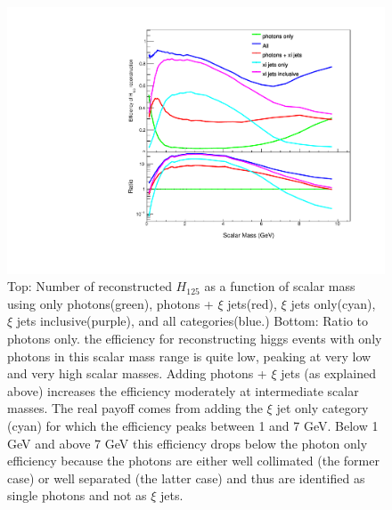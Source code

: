 \documentclass[aps,onecolumn,twoside,secnumarabic,balancelastpage,amsmath,amssymb,nofootinbib,hyperref=pdftex]{revtex4}
\begin{document}
\begin{figure}[t]
\begin{center}
\includegraphics[width=12cm]{higgs_reco_eff.pdf}

\caption{Top: Number of reconstructed $H_{125}$ as a function of scalar mass using only photons(green), photons + $\xi$ jets(red), $\xi$ jets only(cyan), $\xi$ jets inclusive(purple), and all categories(blue.)  Bottom: Ratio to photons only.  the efficiency for reconstructing higgs events with only photons in this scalar mass range is quite low, peaking at very low and very high scalar masses. Adding photons + $\xi$ jets (as explained above) increases the efficiency moderately at intermediate scalar masses. The real payoff comes from adding the $\xi$ jet only category (cyan) for which the efficiency peaks between 1 and 7 GeV. Below 1 GeV and above 7 GeV this efficiency drops below the photon only efficiency because the photons are either well collimated (the former case) or well separated (the latter case) and thus are identified as single photons and not as $\xi$ jets.}
\label{fig:higgs_reco_eff}
\end{center}
\end{figure}




\end{document}
